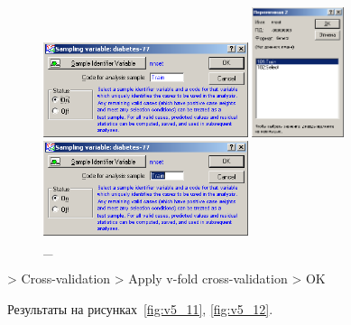 \begin{figure}[!h]
  \centering

  \begin{minipage}{0.32\textwidth}
    \centering

    \includegraphics[width=6cm]
    {inc/v5_8.PNG}

    \caption{\_}

    \label{fig:v5_8}
  \end{minipage}
  \begin{minipage}{0.32\textwidth}
    \centering

    \includegraphics[height=3.8cm]
    {inc/v5_9.PNG}

    \caption{\_}

    \label{fig:v5_9}
  \end{minipage}
  \begin{minipage}{0.32\textwidth}
    \centering

    \includegraphics[width=6cm]
    {inc/v5_10.PNG}

    \caption{\_}

    \label{fig:v5_10}
  \end{minipage}
\end{figure}

\newpage

> Cross-validation > Apply v-fold cross-validation > OK

Результаты на рисунках~\ref{fig:v5_11}, \ref{fig:v5_12}.

